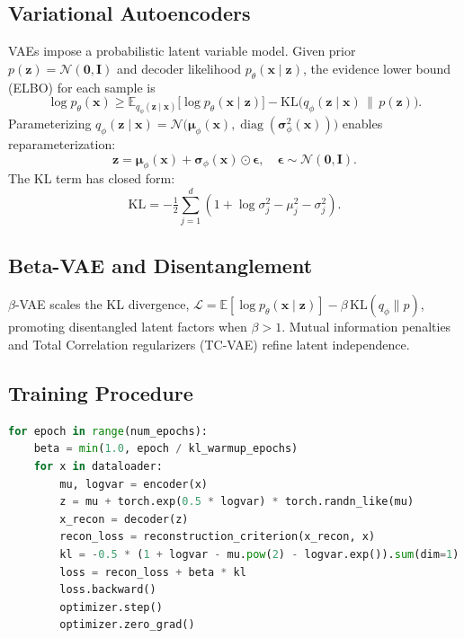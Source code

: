 \documentclass{article}
\begin{document}
\subsection{Variational Autoencoders}
VAEs impose a probabilistic latent variable model. Given prior $p(\mathbf{z}) = \mathcal{N}(\mathbf{0}, \mathbf{I})$ and decoder likelihood $p_\theta(\mathbf{x} \mid \mathbf{z})$, the evidence lower bound (ELBO) for each sample is
\begin{equation}
  \log p_\theta(\mathbf{x}) \ge \mathbb{E}_{q_\phi(\mathbf{z} \mid \mathbf{x})} \bigl[\log p_\theta(\mathbf{x} \mid \mathbf{z})\bigr] - \mathrm{KL}\bigl(q_\phi(\mathbf{z} \mid \mathbf{x}) \,\|\, p(\mathbf{z})\bigr).
\end{equation}
Parameterizing $q_\phi(\mathbf{z} \mid \mathbf{x}) = \mathcal{N}\bigl(\boldsymbol{\mu}_\phi(\mathbf{x}), \operatorname{diag}(\boldsymbol{\sigma}^2_\phi(\mathbf{x}))\bigr)$ enables reparameterization:
\begin{equation}
  \mathbf{z} = \boldsymbol{\mu}_\phi(\mathbf{x}) + \boldsymbol{\sigma}_\phi(\mathbf{x}) \odot \boldsymbol{\epsilon}, \quad \boldsymbol{\epsilon} \sim \mathcal{N}(\mathbf{0}, \mathbf{I}).
\end{equation}
The KL term has closed form:
\begin{equation}
  \mathrm{KL} = -\tfrac{1}{2} \sum_{j=1}^{d} \left(1 + \log \sigma_j^2 - \mu_j^2 - \sigma_j^2 \right).
\end{equation}

\subsection{Beta-VAE and Disentanglement}
$\beta$-VAE scales the KL divergence, $\mathcal{L} = \mathbb{E}[\log p_\theta(\mathbf{x} \mid \mathbf{z})] - \beta\, \mathrm{KL}(q_\phi \| p)$, promoting disentangled latent factors when $\beta > 1$. Mutual information penalties and Total Correlation regularizers (TC-VAE) refine latent independence.

\subsection{Training Procedure}
\begin{lstlisting}[language=Python, caption={Variational autoencoder training loop with KL annealing.}]
for epoch in range(num_epochs):
    beta = min(1.0, epoch / kl_warmup_epochs)
    for x in dataloader:
        mu, logvar = encoder(x)
        z = mu + torch.exp(0.5 * logvar) * torch.randn_like(mu)
        x_recon = decoder(z)
        recon_loss = reconstruction_criterion(x_recon, x)
        kl = -0.5 * (1 + logvar - mu.pow(2) - logvar.exp()).sum(dim=1).mean()
        loss = recon_loss + beta * kl
        loss.backward()
        optimizer.step()
        optimizer.zero_grad()
\end{lstlisting}
\end{document}
